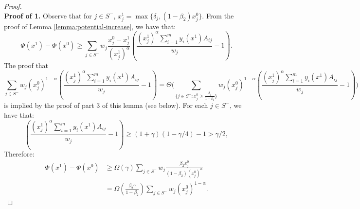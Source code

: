 \documentclass[11pt]{article}
\begin{document}
\begin{proof}
$\quad$\\
\noindent\textbf{Proof of 1.} Observe that for $j\in S^-$, $x_j^1 = \max\{\delta_j, (1-\beta_2)x_j^0\}$. From the proof of Lemma \ref{lemma:potential-increase}, we have that: 
\begin{equation*}\Phi(x^1)-\Phi(x^0)\geq \sum_{j\in S^-} w_j \frac{x_j^0 - x_j^1}{(x_j^1)^{\alpha}}\left( \frac{(x_j^1)^{\alpha}\sum_{i=1}^my_i(x^1)A_{ij}}{w_j} - 1\right).
\end{equation*}
The proof that
\begin{equation*}
\sum_{j\in S^-} w_j {(x_j^0)}^{1-\alpha}\left( \frac{(x_j^1)^{\alpha}\sum_{i=1}^my_i(x^1)A_{ij}}{w_j} - 1\right) = \Theta\Bigg( \sum_{\{j\in S^-:x_j^0 \geq \frac{\delta_j}{1-\beta_2} \}} w_j {(x_j^0)}^{1-\alpha}\left( \frac{(x_j^1)^{\alpha}\sum_{i=1}^my_i(x^1)A_{ij}}{w_j} - 1\right)\Bigg)
\end{equation*}
is implied by the proof of part 3 of this lemma (see below). 
For each $j\in S^-$, we have that:
\begin{equation*}
\left(\frac{(x_j^1)^{\alpha}\sum_{i=1}^my_i(x^1)A_{ij}}{w_j} - 1\right) \geq (1+\gamma)(1-\gamma/4)-1 > \gamma/2,
\end{equation*}
Therefore:
\begin{align*}
\Phi(x^1) - \Phi(x^0) &\geq \Omega(\gamma) \sum_{j\in S^-} w_j \frac{\beta_2 x_j^0}{(1-\beta_2)(x_j^0)^{\alpha}}\\
&= \Omega\left(\frac{\beta_2\gamma}{1-\beta_2}\right)\sum_{j\in S^-} w_j {(x_j^0)}^{1-\alpha}.
\end{align*}



\end{proof}
\end{document}
